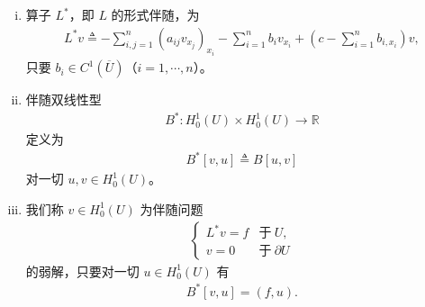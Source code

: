 \documentclass[../../main.tex]{subfiles}
\begin{document}
\begin{definition}\label{definition:ch06-伴随}
\leavevmode
\begin{enumerate}[(i)]
\item 算子 $L^{*}$，即 $L$ 的形式伴随，为
\begin{align*}
L^{*}v\triangleq-\sum_{i,j=1}^{n}(a_{ij}v_{x_{j}})_{x_{i}}-\sum_{i=1}^{n}b_{i}v_{x_{i}}+\left(c-\sum_{i=1}^{n}b_{i,x_{i}}\right)v,
\end{align*}
只要 $b_{i}\in C^{1}(\overline{U})$（$i=1,\cdots,n$）。
\item 伴随双线性型
\begin{align*}
B^{*}:H^{1}_{0}(U)\times H^{1}_{0}(U)\to\mathbb{R}
\end{align*}
定义为
\begin{align*}
B^{*}[v,u]\triangleq B[u,v]
\end{align*}
对一切 $u,v\in H^{1}_{0}(U)$。
\item 我们称 $v\in H^{1}_{0}(U)$ 为伴随问题
\begin{align*}
\begin{cases}
L^{*}v=f & \text{于}\ U,\\
v=0 & \text{于}\ \partial U
\end{cases}
\end{align*}
的弱解，只要对一切 $u\in H^{1}_{0}(U)$ 有
\begin{align*}
B^{*}[v,u]=(f,u).
\end{align*}
\end{enumerate}
\end{definition}
\end{document}
